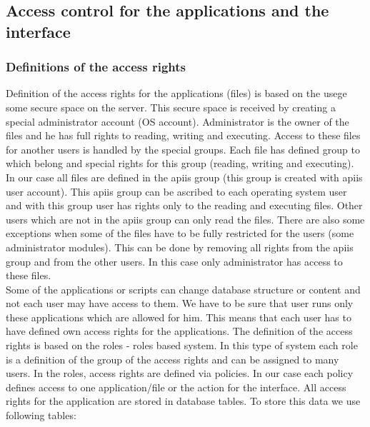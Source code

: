 \subsection{Access control for the applications and the interface\label{acftaati}} 
\subsubsection{Definitions of the access rights \label{filesysard}} 
 
Definition of the access rights for the applications (files) is based on the usege some secure space on the server. This secure space is received by creating a special administrator account (OS account). Administrator is the owner of the files and he has full rights to reading, writing and executing. Access to these files for another users is handled by the special groups. Each file has defined group to which belong and special rights for this group (reading, writing and executing). In our case all files are defined in the apiis group (this group is created with apiis user account). This apiis group can be ascribed to each operating system user and with this group user has rights only to the reading and executing files. Other users which are not in the apiis group can only read the files. There are also some exceptions when some of the files have to be fully restricted for the users (some administrator modules). This can be done by removing all rights from the apiis group and from the other users. In this case only administrator has access to these files.
\\
Some of the applications or scripts can change database structure or content and not each user may have access to them. We have to be sure that user runs only these applications which are allowed for him. This means that each user has to have defined own access rights for the applications. The definition of the access rights is based on the roles - roles based system. In this type of system each role is a definition of the group of the access rights and can be assigned to many users. In the roles, access rights are defined via policies. In our case each policy defines access to one application/file or the action for the interface.
All access rights for the application are stored in database tables. To store this data we use following tables:
